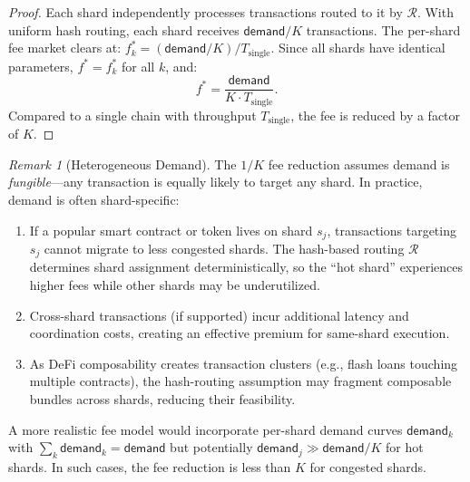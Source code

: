 \documentclass[11pt,a4paper]{article}
\theoremstyle{definition}
\theoremstyle{remark}
\newtheorem{remark}[theorem]{Remark}
\begin{document}
\begin{proof}
Each shard independently processes transactions routed to it by
$\mathcal{R}$.
With uniform hash routing, each shard receives $\mathsf{demand}/K$
transactions.
The per-shard fee market clears at:
$f_k^* = (\mathsf{demand}/K) / T_{\text{single}}$.
Since all shards have identical parameters, $f^* = f_k^*$ for all $k$,
and:
\[
  f^* = \frac{\mathsf{demand}}{K \cdot T_{\text{single}}}.
\]
Compared to a single chain with throughput $T_{\text{single}}$, the fee
is reduced by a factor of $K$.
\end{proof}

\begin{remark}[Heterogeneous Demand]\label{rem:fee-heterogeneous}
The $1/K$ fee reduction assumes demand is \emph{fungible}---any transaction
is equally likely to target any shard.
In practice, demand is often shard-specific:
\begin{enumerate}[label=(\roman*),nosep]
  \item If a popular smart contract or token lives on shard $s_j$,
    transactions targeting $s_j$ cannot migrate to less congested shards.
    The hash-based routing $\mathcal{R}$ determines shard assignment
    deterministically, so the ``hot shard'' experiences higher fees
    while other shards may be underutilized.
  \item Cross-shard transactions (if supported) incur additional latency
    and coordination costs, creating an effective premium for same-shard
    execution.
  \item As DeFi composability creates transaction clusters (e.g., flash
    loans touching multiple contracts), the hash-routing assumption may
    fragment composable bundles across shards, reducing their feasibility.
\end{enumerate}
A more realistic fee model would incorporate per-shard demand curves
$\mathsf{demand}_k$ with $\sum_k \mathsf{demand}_k = \mathsf{demand}$
but potentially $\mathsf{demand}_j \gg \mathsf{demand}/K$ for hot shards.
In such cases, the fee reduction is less than $K$ for congested shards.
\end{remark}
\end{document}
